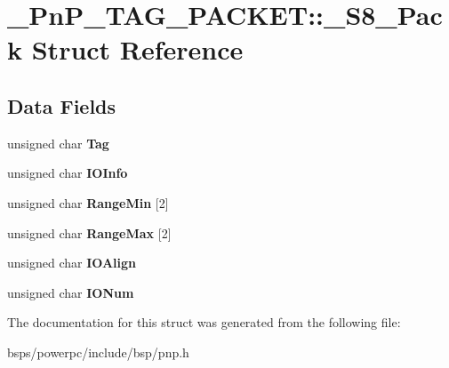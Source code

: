 \hypertarget{struct__PnP__TAG__PACKET_1_1__S8__Pack}{}\section{\+\_\+\+Pn\+P\+\_\+\+T\+A\+G\+\_\+\+P\+A\+C\+K\+ET\+::\+\_\+\+S8\+\_\+\+Pack Struct Reference}
\label{struct__PnP__TAG__PACKET_1_1__S8__Pack}
\subsection*{Data Fields}
\begin{DoxyCompactItemize}
\item 
\mbox{\label{struct__PnP__TAG__PACKET_1_1__S8__Pack_a193504db6ae9ff9d6c329389d8576394}} 
unsigned char {\bfseries Tag}
\item 
\mbox{\label{struct__PnP__TAG__PACKET_1_1__S8__Pack_a9e9ab6034786873cd5919e82778cb8cb}} 
unsigned char {\bfseries I\+O\+Info}
\item 
\mbox{\label{struct__PnP__TAG__PACKET_1_1__S8__Pack_af52e39c9f160af2c2de75e8db279dc68}} 
unsigned char {\bfseries Range\+Min} \mbox{[}2\mbox{]}
\item 
\mbox{\label{struct__PnP__TAG__PACKET_1_1__S8__Pack_a883420981ce35a9fb4229cb1473e2991}} 
unsigned char {\bfseries Range\+Max} \mbox{[}2\mbox{]}
\item 
\mbox{\label{struct__PnP__TAG__PACKET_1_1__S8__Pack_a569a1e84e551aa37b9ad372ca5f648f5}} 
unsigned char {\bfseries I\+O\+Align}
\item 
\mbox{\label{struct__PnP__TAG__PACKET_1_1__S8__Pack_a3b7ca316c66bd661851fda7b2607ab52}} 
unsigned char {\bfseries I\+O\+Num}
\end{DoxyCompactItemize}


The documentation for this struct was generated from the following file\+:\begin{DoxyCompactItemize}
\item 
bsps/powerpc/include/bsp/pnp.\+h\end{DoxyCompactItemize}
